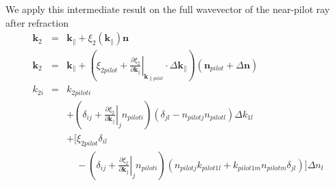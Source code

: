 \documentclass[12pt,a4paper,twoside,openright,BCOR10mm,headsepline,titlepage,abstracton,chapterprefix,final]{scrreprt}
\newcommand\Vector[1]{{\mathbf{#1}}}
\newcommand\wavenumber{k}
\newcommand\Wavevector{\Vector{\wavenumber}}
\begin{document}
We apply this intermediate result on the full wavevector of the near-pilot ray after refraction
\begin{eqnarray}
 \Wavevector_2 &=& \Wavevector_{\parallel} + \xi_2(\Wavevector_{\parallel}) \Vector{n} \\
 \Wavevector_2 &=& \Wavevector_{\parallel}
                 + \left(
                     \xi_{2 pilot} +
                     \left. \frac{\partial \xi_2}{\partial \Wavevector_{\parallel}} \right|_{\Wavevector_{\parallel pilot}}
                     \cdot \Delta \Wavevector_{\parallel}
                   \right)
                   \left(
                     \Vector{n}_{pilot} + \Delta \Vector{n} 
                   \right)
 \\ 
 \wavenumber_{2i}
 &=& 
 \wavenumber_{2pilot i} \nonumber \\
 &&+ \left( 
       \delta_{ij}
       + \left. \frac{\partial \xi_2}{\partial \Wavevector_{\parallel}} \right|_j n_{pilot i}
     \right) 
     ( \delta_{jl} -  n_{pilot j} n_{pilot l} ) \Delta \wavenumber_{1l} \nonumber\\
 &&+ \Bigg[
     \xi_{2 pilot} \delta_{il} \nonumber\\
 &&\quad- 
     \left( 
       \delta_{ij}
       + \left. \frac{\partial \xi_2}{\partial \Wavevector_{\parallel}} \right|_j n_{pilot i}
     \right) 
     ( n_{pilot j} \wavenumber_{pilot1 l} + \wavenumber_{pilot1 m}   n_{pilot m} \delta_{jl}) 
   \Bigg] \Delta n_l
\end{eqnarray}
\end{document}
